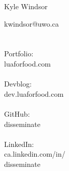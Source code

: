 \documentclass{article}
\begin{document}
{
	{\Huge Kyle Windsor}\\
	\vspace{0.3in}
}

\begin{minipage}[t]{0.25\hsize}\color{contact} %
	kwindsor@uwo.ca\\
	\\\\
	Portfolio:\\
	luaforfood.com\\
	\\
	Devblog:\\
	dev.luaforfood.com\\
	\\
	GitHub:\\
	disseminate\\
	\\
	LinkedIn:\\
	ca.linkedin.com/in/\\
	disseminate\\
\end{minipage}
\end{document}

